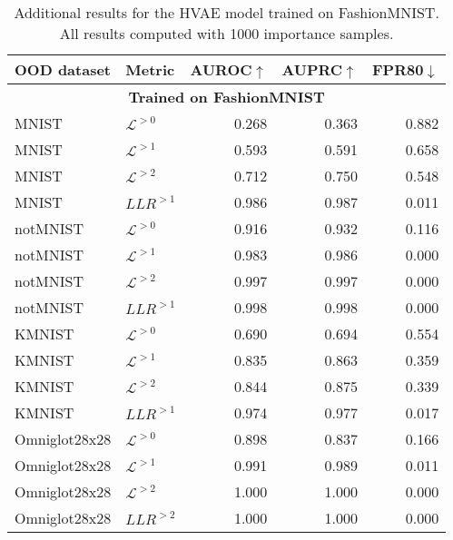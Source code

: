 {\begin{table}[t]
    \caption[Additional results for the HVAE model trained on FashionMNIST]{Additional results for the HVAE model trained on FashionMNIST. All results computed with 1000 importance samples.}
    \centering
    \begin{tabular}{llrrr}
        \toprule
         OOD dataset & Metric & AUROC$\uparrow$ & AUPRC$\uparrow$ & FPR80$\downarrow$ \\
         \midrule
         \multicolumn{5}{c}{\textbf{Trained on FashionMNIST}} \\
         \midrule
MNIST                    & $\mathcal{L}^{>0}$     &  0.268  &  0.363  &  0.882 \\
MNIST                    & $\mathcal{L}^{>1}$     &  0.593  &  0.591  &  0.658 \\
MNIST                    & $\mathcal{L}^{>2}$     &  0.712  &  0.750  &  0.548 \\
MNIST                    & $LLR^{>1}$             &  0.986  &  0.987  &  0.011 \\
\midrule
notMNIST                 &  $\mathcal{L}^{>0}$    &  0.916  &  0.932  &  0.116 \\
notMNIST                 &  $\mathcal{L}^{>1}$    &  0.983  &  0.986  &  0.000 \\
notMNIST                 &  $\mathcal{L}^{>2}$    &  0.997  &  0.997  &  0.000 \\
notMNIST                 &  $LLR^{>1}$            &  0.998  &  0.998  &  0.000 \\
\midrule
KMNIST                   &  $\mathcal{L}^{>0}$    &  0.690  &  0.694  &  0.554 \\
KMNIST                   &  $\mathcal{L}^{>1}$    &  0.835  &  0.863  &  0.359 \\
KMNIST                   &  $\mathcal{L}^{>2}$    &  0.844  &  0.875  &  0.339 \\
KMNIST                   &  $LLR^{>1}$            &  0.974  &  0.977  &  0.017 \\
\midrule
Omniglot28x28            &  $\mathcal{L}^{>0}$    &  0.898  &  0.837  &  0.166 \\
Omniglot28x28            &  $\mathcal{L}^{>1}$    &  0.991  &  0.989  &  0.011 \\
Omniglot28x28            &  $\mathcal{L}^{>2}$    &  1.000  &  1.000  &  0.000 \\
Omniglot28x28            &  $LLR^{>2}$            &  1.000  &  1.000  &  0.000 \\

\end{tabular}
\end{table}}
